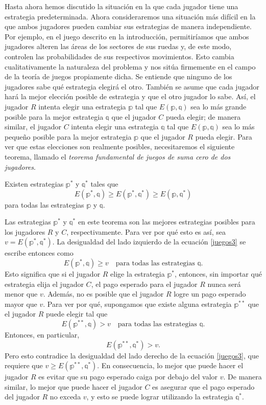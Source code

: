 Hasta ahora hemos discutido la situación en la que cada jugador tiene una estrategia predeterminada. Ahora consideraremos una situación más difícil en la que ambos jugadores pueden cambiar sus estrategias de manera independiente. Por ejemplo, en el juego descrito en la introducción, permitiríamos que ambos jugadores alteren las áreas de los sectores de sus ruedas y, de este modo, controlen las probabilidades de sus respectivos movimientos. Esto cambia cualitativamente la naturaleza del problema y nos sitúa firmemente en el campo de la teoría de juegos propiamente dicha. Se entiende que ninguno de los jugadores sabe qué estrategia elegirá el otro. También se asume que cada jugador hará la mejor elección posible de estrategia y que el otro jugador lo sabe. Así, el jugador $R$ intenta elegir una estrategia $\mathbb{p}$ tal que $E(\mathbb{p}, \mathbb{q})$ sea lo más grande posible para la mejor estrategia $\mathbb{q}$ que el jugador $C$ pueda elegir; de manera similar, el jugador $C$ intenta elegir una estrategia $\mathbb{q}$ tal que $E(\mathbb{p}, \mathbb{q})$ sea lo más pequeño posible para la mejor estrategia $\mathbb{p}$ que el jugador $R$ pueda elegir. Para ver que estas elecciones son realmente posibles, necesitaremos el siguiente teorema, llamado el \emph{teorema fundamental de juegos de suma cero de dos jugadores}.

\begin{theorem}{}{}
    Existen estrategias $\mathbb{p}^*$ y $\mathbb{q}^*$ tales que
    \begin{equation}
        E(\mathbb{p}^*, \mathbb{q}) \geq E(\mathbb{p}^*, \mathbb{q}^*) \geq E(\mathbb{p}, \mathbb{q}^*) \label{juegos3}
    \end{equation}
    para todas las estrategias $\mathbb{p}$ y $\mathbb{q}$.
\end{theorem}

Las estrategias $\mathbb{p}^*$ y $\mathbb{q}^*$ en este teorema son las mejores estrategias posibles para los jugadores $R$ y $C$, respectivamente. Para ver por qué esto es así, sea $v = E(\mathbb{p}^*, \mathbb{q}^*)$. La desigualdad del lado izquierdo de la ecuación \eqref{juegos3} se escribe entonces como
$$E(\mathbb{p}^*, \mathbb{q}) \geq v \quad \text{para todas las estrategias } \mathbb{q}.$$
Esto significa que si el jugador $R$ elige la estrategia $\mathbb{p}^*$, entonces, sin importar qué estrategia elija el jugador $C$, el pago esperado para el jugador $R$ nunca será menor que $v$. Además, no es posible que el jugador $R$ logre un pago esperado mayor que $v$. Para ver por qué, supongamos que existe alguna estrategia $\mathbb{p}^{**}$ que el jugador $R$ puede elegir tal que
$$E(\mathbb{p}^{**}, \mathbb{q}) > v \quad \text{para todas las estrategias } \mathbb{q}.$$
Entonces, en particular,
$$E(\mathbb{p}^{**}, \mathbb{q}^*) > v.$$
Pero esto contradice la desigualdad del lado derecho de la ecuación \eqref{juegos3}, que requiere que $v \geq E(\mathbb{p}^{**}, \mathbb{q}^*)$. En consecuencia, lo mejor que puede hacer el jugador $R$ es evitar que su pago esperado caiga por debajo del valor $v$. De manera similar, lo mejor que puede hacer el jugador $C$ es asegurar que el pago esperado del jugador $R$ no exceda $v$, y esto se puede lograr utilizando la estrategia $\mathbb{q}^*$.

